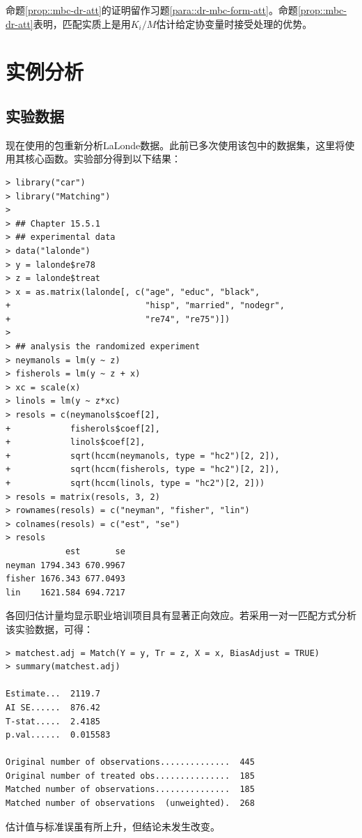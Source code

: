 命题\ref{prop::mbc-dr-att}的证明留作习题\ref{para::dr-mbc-form-att}。命题\ref{prop::mbc-dr-att}表明，匹配实质上是用$K_i/M$估计给定协变量时接受处理的优势。 




\section{实例分析}
\label{sec::matching-application}



\subsection{实验数据}
现在使用\citet{sekhon2011multivariate}的包重新分析LaLonde数据。此前已多次使用该包中的数据集，这里将使用其核心函数。实验部分得到以下结果：
\begin{lstlisting}
> library("car")
> library("Matching")
> 
> ## Chapter 15.5.1
> ## experimental data
> data("lalonde")
> y = lalonde$re78
> z = lalonde$treat
> x = as.matrix(lalonde[, c("age", "educ", "black",
+                           "hisp", "married", "nodegr",
+                           "re74", "re75")])
> 
> ## analysis the randomized experiment
> neymanols = lm(y ~ z)
> fisherols = lm(y ~ z + x)
> xc = scale(x)
> linols = lm(y ~ z*xc)
> resols = c(neymanols$coef[2],
+            fisherols$coef[2],
+            linols$coef[2],
+            sqrt(hccm(neymanols, type = "hc2")[2, 2]),
+            sqrt(hccm(fisherols, type = "hc2")[2, 2]),
+            sqrt(hccm(linols, type = "hc2")[2, 2]))
> resols = matrix(resols, 3, 2)
> rownames(resols) = c("neyman", "fisher", "lin")
> colnames(resols) = c("est", "se")
> resols 
            est       se
neyman 1794.343 670.9967
fisher 1676.343 677.0493
lin    1621.584 694.7217
\end{lstlisting} 
各回归估计量均显示职业培训项目具有显著正向效应。若采用一对一匹配方式分析该实验数据，可得：
\begin{lstlisting}
> matchest.adj = Match(Y = y, Tr = z, X = x, BiasAdjust = TRUE)
> summary(matchest.adj)

Estimate...  2119.7 
AI SE......  876.42 
T-stat.....  2.4185 
p.val......  0.015583 

Original number of observations..............  445 
Original number of treated obs...............  185 
Matched number of observations...............  185 
Matched number of observations  (unweighted).  268
\end{lstlisting} 
估计值与标准误虽有所上升，但结论未发生改变。 


